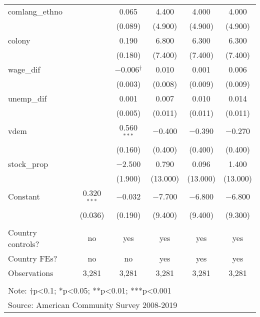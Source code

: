 \documentclass[
  11pt,
]{article}
\begin{document}
\begin{table}[!htbp]
\begin{tabular}{@{\extracolsep{5pt}}lccccc}
  comlang\_ethno &  & 0.065 & 4.400 & 4.000 & 4.000 \\ 
  &  & (0.089) & (4.900) & (4.900) & (4.900) \\ 
  colony &  & 0.190 & 6.800 & 6.300 & 6.300 \\ 
  &  & (0.180) & (7.400) & (7.400) & (7.400) \\ 
  wage\_dif &  & $-$0.006$^{†}$ & 0.010 & 0.001 & 0.006 \\ 
  &  & (0.003) & (0.008) & (0.009) & (0.009) \\ 
  unemp\_dif &  & 0.001 & 0.007 & 0.010 & 0.014 \\ 
  &  & (0.005) & (0.011) & (0.011) & (0.011) \\ 
  vdem &  & 0.560$^{***}$ & $-$0.400 & $-$0.390 & $-$0.270 \\ 
  &  & (0.160) & (0.400) & (0.400) & (0.400) \\ 
  stock\_prop &  & $-$2.500 & 0.790 & 0.096 & 1.400 \\ 
  &  & (1.900) & (13.000) & (13.000) & (13.000) \\ 
  Constant & 0.320$^{***}$ & $-$0.032 & $-$7.700 & $-$6.800 & $-$6.800 \\ 
  & (0.036) & (0.190) & (9.400) & (9.400) & (9.300) \\ 
 \hline \\[-1.8ex] 
Country controls? & no & yes & yes & yes & yes \\ 
Country FEs? & no & no & yes & yes & yes \\ 
Observations & 3,281 & 3,281 & 3,281 & 3,281 & 3,281 \\ 
\hline 
\hline \\[-1.8ex] 
\multicolumn{6}{l}{Note: †p<0.1; *p<0.05; **p<0.01; ***p<0.001} \\ 
\multicolumn{6}{l}{Source: American Community Survey 2008-2019} \\ 
\end{tabular} 
\end{table}
\end{document}
